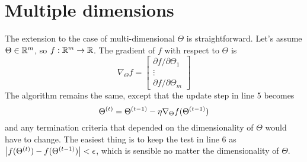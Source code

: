 \section{Multiple dimensions}
\label{sec-gd}

The extension to the case of multi-dimensional $\Theta$ is
straightforward.  Let's  assume $\Theta \in \mathbb{R}^m$, so $f: \mathbb{R}^m
  \rightarrow \mathbb{R}$. The
gradient of $f$ with respect to $\Theta$ is
\[
  \nabla_\Theta f =
  \begin{bmatrix}
    \partial f / \partial \Theta_1 \\
    \vdots                         \\
    \partial f / \partial \Theta_m
  \end{bmatrix}
\]
The algorithm remains the same, except that the update step in line 5
becomes
\[ \Theta^{(t)} = \Theta^{(t-1)} - \eta\nabla_\Theta f(\Theta^{(t-1)}) \]
and any termination criteria that depended on the dimensionality
of $\Theta$ would have to change.  The easiest thing is
to keep the test in line 6 as $\left|f(\Theta^{(t)}) -
  f(\Theta^{(t-1)}) \right| < \epsilon$, which is sensible no matter
the dimensionality of $\Theta$.




